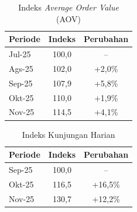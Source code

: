 \begin{table}[h!]
    \centering
    \caption{Indeks \textit{Average Order Value} (AOV)}
    \label{tab:prasurvey3_indeks_aov}
    \begin{tabular}{lcc}
        \toprule
        \textbf{Periode} & \textbf{Indeks} & \textbf{Perubahan} \\
        \midrule
        Jul-25           & 100,0           & --                 \\
        Ags-25           & 102,0           & +2,0\%             \\
        Sep-25           & 107,9           & +5,8\%             \\
        Okt-25           & 110,0           & +1,9\%             \\
        Nov-25           & 114,5           & +4,1\%             \\
        \bottomrule
    \end{tabular}
\end{table}

\begin{table}[h!]
    \centering
    \caption{Indeks Kunjungan Harian}
    \label{tab:prasurvey3_indeks_kunjungan}
    \begin{tabular}{lcc}
        \toprule
        \textbf{Periode} & \textbf{Indeks} & \textbf{Perubahan} \\
        \midrule
        Sep-25           & 100,0           & --                 \\
        Okt-25           & 116,5           & +16,5\%            \\
        Nov-25           & 130,7           & +12,2\%            \\
        \bottomrule
    \end{tabular}
\end{table}

